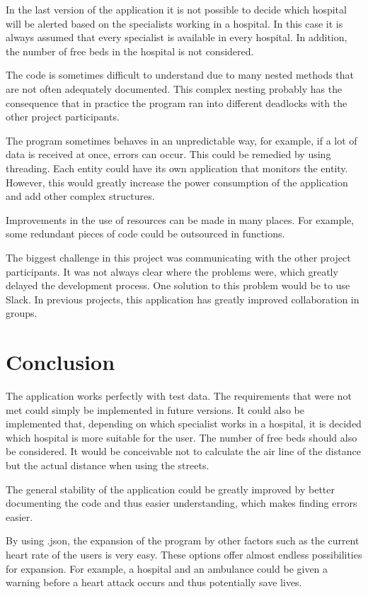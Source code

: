 In the last version of the application it is not possible to decide which hospital will be alerted based on the specialists working in a hospital. In this case it is always assumed that every specialist is available in every hospital. In addition, the number of free beds in the hospital is not considered.

The code is sometimes difficult to understand due to many nested methods that are not often adequately documented. This complex nesting probably has the consequence that in practice the program ran into different deadlocks with the other project participants.

The program sometimes behaves in an unpredictable way, for example, if a lot of data is received at once, errors can occur. This could be remedied by using threading. Each entity could have its own application that monitors the entity. However, this would greatly increase the power consumption of the application and add other complex structures. 

Improvements in the use of resources can be made in many places. For example, some redundant pieces of code could be outsourced in functions.

The biggest challenge in this project was communicating with the other project participants. It was not always clear where the problems were, which greatly delayed the development process. One solution to this problem would be to use Slack. In previous projects, this application has greatly improved collaboration in groups.


\section{Conclusion}
\label{sec:5}
The application works perfectly with test data. The requirements that were not met could simply be implemented in future versions. It could also be implemented that, depending on which specialist works in a hospital, it is decided which hospital is more suitable for the user. The number of free beds should also be considered. It would be conceivable not to calculate the air line of the distance but the actual distance when using the streets.

The general stability of the application could be greatly improved by better documenting the code and thus easier understanding, which makes finding errors easier.

By using .json, the expansion of the program by other factors such as the current heart rate of the users is very easy. These options offer almost endless possibilities for expansion. For example, a hospital and an ambulance could be given a warning before a heart attack occurs and thus potentially save lives.

\newpage


